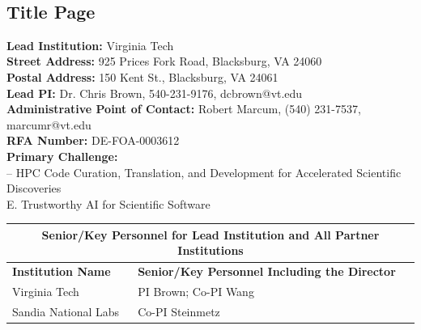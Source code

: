\begin{center}
    \large{\proposalEleven} \\ \vspace{0.5pt}
\end{center}\vspace{-15pt}

\subsection*{Title Page} \vspace{12pt}

\textbf{Lead Institution:} Virginia Tech \\

\noindent\textbf{Street Address:} 925 Prices Fork Road, Blacksburg, VA 24060 \\

\noindent\textbf{Postal Address:} 150 Kent St., Blacksburg, VA 24061\\

\noindent\textbf{Lead PI:} Dr. Chris Brown, 540-231-9176, dcbrown@vt.edu \\

\noindent\textbf{Administrative Point of Contact:} Robert Marcum, (540) 231-7537, marcumr@vt.edu \\

\noindent\textbf{RFA Number:} DE-FOA-0003612 \\

\noindent\textbf{Primary Challenge:} \\

 -- HPC Code Curation, Translation, and Development for Accelerated Scientific Discoveries \\
E. Trustworthy AI for Scientific Software \\

\begin{table}[h]
    \begin{tabular}{|l|l|}
    \hline
    \multicolumn{2}{|c|}{\textbf{Senior/Key Personnel for Lead Institution and All Partner Institutions}}  \\ \hline
        \textbf{Institution Name} & \textbf{Senior/Key Personnel Including the Director} \\ \hline
        Virginia Tech & PI Brown; Co-PI Wang \\ \hline
        Sandia National Labs & Co-PI Steinmetz \\ \hline
    \end{tabular}
    \label{tab:my_label}
\end{table}

